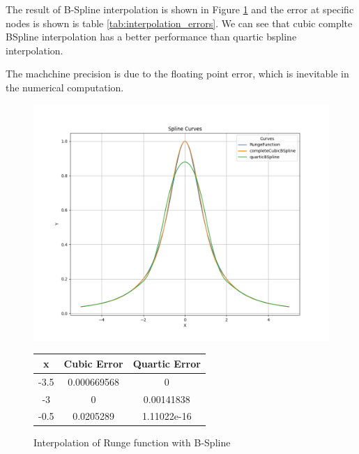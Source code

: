 \documentclass[a4paper]{article}
\begin{document}
The result of B-Spline interpolation is shown in Figure \ref{fig:bspline_interpolation} and the error at specific nodes is shown is table \ref{tab:interpolation_errors}. We can see that cubic complte BSpline interpolation has a better performance than quartic bspline interpolation.

The machchine precision is due to the floating point error, which is inevitable in the numerical computation.

\begin{figure}[h]
  \centering
  \begin{minipage}{0.6\textwidth} %
    \centering
    \includegraphics[width=\linewidth]{figures/C.png}
    \caption{Interpolation of Runge function with B-Spline}
    \label{fig:bspline_interpolation}
  \end{minipage}
  \hfill
  \begin{minipage}{0.35\textwidth} %
    \centering
    \renewcommand{\arraystretch}{1.2} %
    \begin{tabular}{|c|c|c|}
      \hline
      \textbf{x} & \textbf{Cubic Error} & \textbf{Quartic Error} \\ \hline
      -3.5       & 0.000669568                    & 0                                \\ \hline
      -3         & 0                              & 0.00141838                       \\ \hline
      -0.5       & 0.0205289                      & 1.11022e-16                      \\ \hline

\end{tabular}
\end{minipage}
\end{figure}
\end{document}
